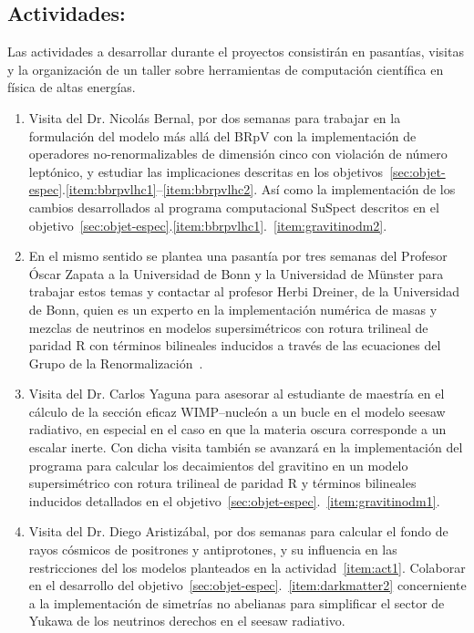 \subsection{Actividades:                                   }
\label{sec:actividades}
Las actividades a desarrollar durante el proyectos consistirán en
pasantías, visitas y la organización de un taller sobre herramientas de
computación científica en física de altas energías.

\begin{enumerate}
\item Visita del Dr. Nicolás Bernal, por dos semanas para trabajar en
  la formulación del modelo más allá del BRpV con la implementación de
  operadores no-renormalizables de dimensión cinco con violación de
  número leptónico, y estudiar las implicaciones descritas en los
  objetivos~\ref{sec:objet-espec}.\ref{item:bbrpvlhc1}--\ref{item:bbrpvlhc2}. Así
  como la implementación de los cambios desarrollados al programa
  computacional SuSpect descritos en el
  objetivo~\ref{sec:objet-espec}.\ref{item:bbrpvlhc1}.~\ref{item:gravitinodm2}. 
  \label{item:act1}

\item En el mismo sentido se plantea una pasantía por tres semanas del
  Profesor Óscar Zapata a la Universidad de Bonn y la Universidad de
  Münster para trabajar estos temas y contactar al profesor Herbi
  Dreiner, de la Universidad de Bonn, quien es un experto en la
  implementación numérica de masas y mezclas de neutrinos en modelos
  supersimétricos con rotura trilineal de paridad R con términos
  bilineales inducidos a través de las ecuaciones del Grupo de la
  Renormalización~\cite{Dreiner:2011ft}.
  \label{item:act2}
\item Visita del Dr. Carlos Yaguna para asesorar al estudiante de
  maestría en el cálculo de la sección eficaz WIMP--nucleón a un bucle
  en el modelo seesaw radiativo, en especial en el caso en que la
  materia oscura corresponde a un escalar inerte. Con dicha visita
  también se avanzará en la implementación del programa para calcular
  los decaimientos del gravitino en un modelo supersimétrico con
  rotura trilineal de paridad R y términos bilineales inducidos
  detallados en el
  objetivo~\ref{sec:objet-espec}.~\ref{item:gravitinodm1}.
  \label{item:act3}

\item Visita del Dr. Diego Aristizábal, por dos semanas para  calcular el
  fondo de rayos cósmicos de positrones y antiprotones, y  su
  influencia en las restricciones del los modelos planteados en la
  actividad~\ref{item:act1}. Colaborar en el desarrollo del
  objetivo~\ref{sec:objet-espec}.~\ref{item:darkmatter2} concerniente
  a la implementación de simetrías no abelianas para simplificar el
  sector de Yukawa de los neutrinos derechos en el seesaw radiativo.
  \label{item:act4}


\end{enumerate}
